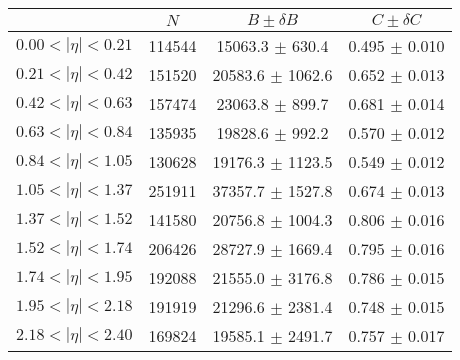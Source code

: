 \begin{tabular}{lccc}
\hline
    &   $N$   & $B \pm \delta B$  &  $C \pm \delta C$ \\
\hline
$0.00 < |\eta| <0.21$          & 114544     & 15063.3    $\pm$ 630.4 & 0.495      $\pm$ 0.010 \\
$0.21 < |\eta| <0.42$          & 151520     & 20583.6    $\pm$ 1062.6 & 0.652      $\pm$ 0.013 \\
$0.42 < |\eta| <0.63$          & 157474     & 23063.8    $\pm$ 899.7 & 0.681      $\pm$ 0.014 \\
$0.63 < |\eta| <0.84$          & 135935     & 19828.6    $\pm$ 992.2 & 0.570      $\pm$ 0.012 \\
$0.84 < |\eta| <1.05$          & 130628     & 19176.3    $\pm$ 1123.5 & 0.549      $\pm$ 0.012 \\
$1.05 < |\eta| <1.37$          & 251911     & 37357.7    $\pm$ 1527.8 & 0.674      $\pm$ 0.013 \\
$1.37 < |\eta| <1.52$          & 141580     & 20756.8    $\pm$ 1004.3 & 0.806      $\pm$ 0.016 \\
$1.52 < |\eta| <1.74$          & 206426     & 28727.9    $\pm$ 1669.4 & 0.795      $\pm$ 0.016 \\
$1.74 < |\eta| <1.95$          & 192088     & 21555.0    $\pm$ 3176.8 & 0.786      $\pm$ 0.015 \\
$1.95 < |\eta| <2.18$          & 191919     & 21296.6    $\pm$ 2381.4 & 0.748      $\pm$ 0.015 \\
$2.18 < |\eta| <2.40$          & 169824     & 19585.1    $\pm$ 2491.7 & 0.757      $\pm$ 0.017 \\
\hline
\end{tabular}
